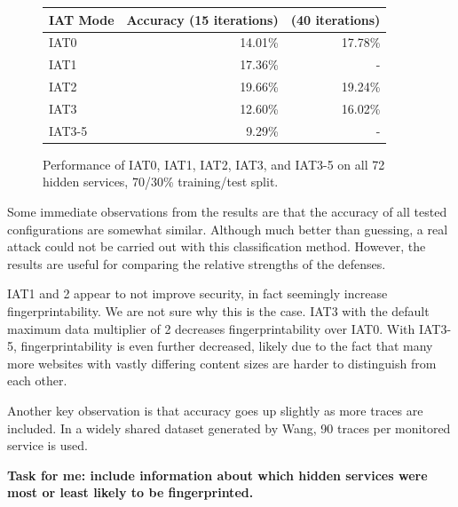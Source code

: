 \documentclass[11pt]{article}
\begin{document}
\begin{figure}[h]
    \centering
    \begin{tabular}{|l|r|r|}
        \hline
        IAT Mode & Accuracy (15 iterations) & (40 iterations) \\
        \hline
        IAT0 & 14.01\% & 17.78\%\\
        IAT1 & 17.36\% & -\\
        IAT2 & 19.66\% & 19.24\%\\
        IAT3 & 12.60\% & 16.02\%\\
        IAT3-5& 9.29\% & -\\
        \hline
    \end{tabular}
    \caption[]{Performance of IAT0, IAT1, IAT2, IAT3, and IAT3-5 on all 72 hidden services, 70/30\% training/test split.}
\end{figure}

Some immediate observations from the results are that the accuracy of all tested configurations are somewhat similar. Although much better than guessing, a real attack could not be carried out with this classification method. However, the results are useful for comparing the relative strengths of the defenses.

IAT1 and 2 appear to not improve security, in fact seemingly increase fingerprintability. We are not sure why this is the case. IAT3 with the default maximum data multiplier of 2 decreases fingerprintability over IAT0. With IAT3-5, fingerprintability is even further decreased, likely due to the fact that many more websites with vastly differing content sizes are harder to distinguish from each other.

Another key observation is that accuracy goes up slightly as more traces are included. In a widely shared dataset generated by Wang\cite{wang}, 90 traces per monitored service is used.

\textbf{Task for me: include information about which hidden services were most or least likely to be fingerprinted.}
\end{document}
